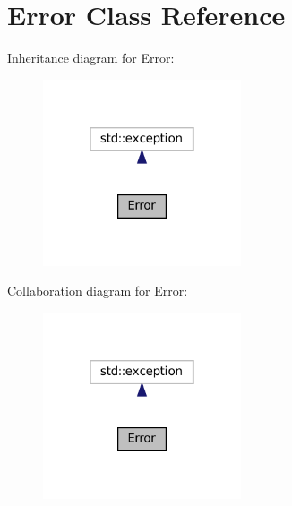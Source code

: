 \hypertarget{class_error}{}\section{Error Class Reference}
\label{class_error}


Inheritance diagram for Error\+:
\nopagebreak
\begin{figure}[H]
\begin{center}
\leavevmode
\includegraphics[width=166pt]{class_error__inherit__graph}
\end{center}
\end{figure}


Collaboration diagram for Error\+:
\nopagebreak
\begin{figure}[H]
\begin{center}
\leavevmode
\includegraphics[width=166pt]{class_error__coll__graph}
\end{center}
\end{figure}
